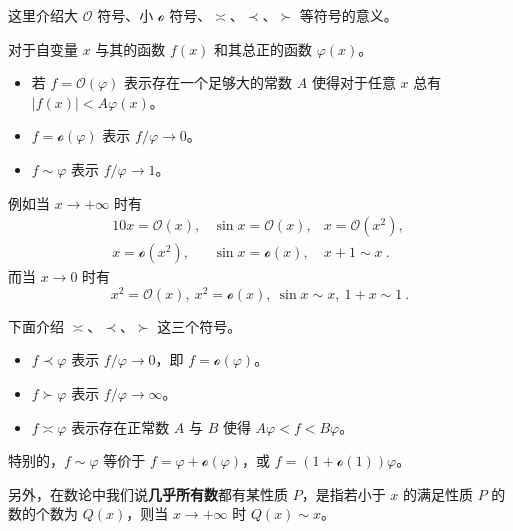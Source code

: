 
这里介绍大 $\mathcal O$ 符号、小 $\mathcal o$ 符号、$\asymp$、$\prec$、$\succ$ 等符号的意义。

对于自变量 $x$ 与其的函数 $f(x)$ 和其总正的函数 $\varphi(x)$。
\begin{itemize}
\item 若 $f=\mathcal O(\varphi)$ 表示存在一个足够大的常数 $A$ 使得对于任意 $x$ 总有 $|f(x)| < A \varphi(x)$。
\item $f = \mathcal o(\varphi)$ 表示 $f/\varphi \rightarrow 0$。
\item $f \sim \varphi$ 表示 $f / \varphi \rightarrow 1$。
\end{itemize}

例如当 $x \rightarrow +\infty$ 时有
\begin{equation}
\begin{matrix}
10x = \mathcal O(x), &\sin x = \mathcal O(x), &x = \mathcal O(x^2), ~\\
x = \mathcal o(x^2), &\sin x = \mathcal o(x), &x + 1 \sim x ~.
\end{matrix}
\end{equation}
而当 $x \rightarrow 0$ 时有
\begin{equation}
x^2 = \mathcal O(x), ~ x^2 = \mathcal o(x), ~ \sin x \sim x , ~ 1+x \sim 1 ~.
\end{equation}

下面介绍 $\asymp$、$\prec$、$\succ$ 这三个符号。
\begin{itemize}
\item $f \prec \varphi$ 表示 $f/\varphi \rightarrow 0$，即 $f = \mathcal o(\varphi)$。
\item $f \succ \varphi$ 表示 $f/\varphi \rightarrow \infty$。
\item $f \asymp \varphi$ 表示存在正常数 $A$ 与 $B$ 使得 $A\varphi < f < B \varphi$。
\end{itemize}

特别的，$f \sim \varphi$ 等价于 $f = \varphi + \mathcal o(\varphi)$，或 $f = (1 + \mathcal o(1))\varphi$。

另外，在数论中我们说\textbf{几乎所有数}都有某性质 $P$，是指若小于 $x$ 的满足性质 $P$ 的数的个数为 $Q(x)$，则当 $x \rightarrow +\infty$ 时 $Q(x) \sim x$。